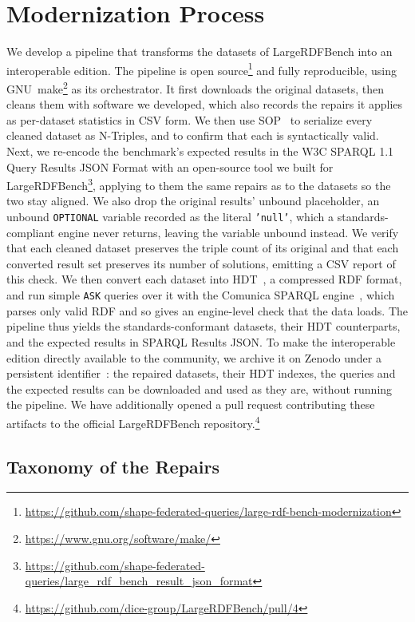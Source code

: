 \section{Modernization Process}
\label{sec:method}

We develop a pipeline that transforms the datasets of LargeRDFBench into an interoperable edition.
The pipeline is open source\footnote{\url{https://github.com/shape-federated-queries/large-rdf-bench-modernization}} and fully reproducible, using GNU~make\footnote{\url{https://www.gnu.org/software/make/}} as its orchestrator.
It first downloads the original datasets, then cleans them with software we developed, which also records the repairs it applies as per-dataset statistics in CSV form.
We then use \ac{SOP}~\cite{Champin2026} to serialize every cleaned dataset as N-Triples, and to confirm that each is syntactically valid.
Next, we re-encode the benchmark's expected results in the W3C SPARQL 1.1 Query Results JSON Format with an open-source tool we built for LargeRDFBench\footnote{\url{https://github.com/shape-federated-queries/large_rdf_bench_result_json_format}}, applying to them the same repairs as to the datasets so the two stay aligned.
We also drop the original results' unbound placeholder, an unbound \texttt{OPTIONAL} variable recorded as the literal \texttt{'null'}, which a standards-compliant engine never returns, leaving the variable unbound instead.
We verify that each cleaned dataset preserves the triple count of its original and that each converted result set preserves its number of solutions, emitting a CSV report of this check.
We then convert each dataset into \ac{HDT}~\cite{FERNANDEZ201322}, a compressed RDF format, and run simple \texttt{ASK} queries over it with the Comunica SPARQL engine~\cite{taelman_iswc_resources_comunica_2018}, which parses only valid RDF and so gives an engine-level check that the data loads.
The pipeline thus yields the standards-conformant datasets, their \ac{HDT} counterparts, and the expected results in SPARQL Results JSON.
To make the interoperable edition directly available to the community, we archive it on Zenodo under a persistent identifier~\cite{tam2026lrbedition}: the repaired datasets, their \ac{HDT} indexes, the queries and the expected results can be downloaded and used as they are, without running the pipeline.
We have additionally opened a pull request contributing these artifacts to the official LargeRDFBench repository.\footnote{\url{https://github.com/dice-group/LargeRDFBench/pull/4}}


\subsection{Taxonomy of the Repairs}

